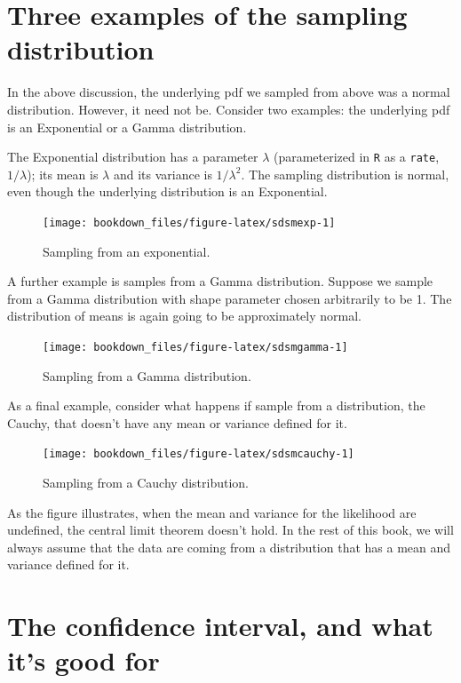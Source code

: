 \documentclass[12pt,]{krantz}
\begin{document}
\hypertarget{three-examples-of-the-sampling-distribution}{%
\section{Three examples of the sampling distribution}\label{three-examples-of-the-sampling-distribution}}

In the above discussion, the underlying pdf we sampled from above was a normal distribution. However, it need not be. Consider two examples: the underlying pdf is an Exponential or a Gamma distribution.

The Exponential distribution has a parameter \(\lambda\) (parameterized in \texttt{R} as a \texttt{rate}, \(1/\lambda\)); its mean is \(\lambda\) and its variance is \(1/\lambda^2\). The sampling distribution is normal, even though the underlying distribution is an Exponential.

\begin{figure}
\texttt{[image: bookdown\_files/figure-latex/sdsmexp-1]} \caption{Sampling from an exponential.}\label{fig:sdsmexp}
\end{figure}

A further example is samples from a Gamma distribution. Suppose we sample from a Gamma distribution with shape parameter chosen arbitrarily to be 1. The distribution of means is again going to be approximately normal.

\begin{figure}
\texttt{[image: bookdown\_files/figure-latex/sdsmgamma-1]} \caption{Sampling from a Gamma distribution.}\label{fig:sdsmgamma}
\end{figure}

As a final example, consider what happens if sample from a distribution, the Cauchy, that doesn't have any mean or variance defined for it.

\begin{figure}
\texttt{[image: bookdown\_files/figure-latex/sdsmcauchy-1]} \caption{Sampling from a Cauchy distribution.}\label{fig:sdsmcauchy}
\end{figure}

As the figure illustrates, when the mean and variance for the likelihood are undefined, the central limit theorem doesn't hold. In the rest of this book, we will always assume that the data are coming from a distribution that has a mean and variance defined for it.

\hypertarget{the-confidence-interval-and-what-its-good-for}{%
\section{The confidence interval, and what it's good for}\label{the-confidence-interval-and-what-its-good-for}}
\end{document}
